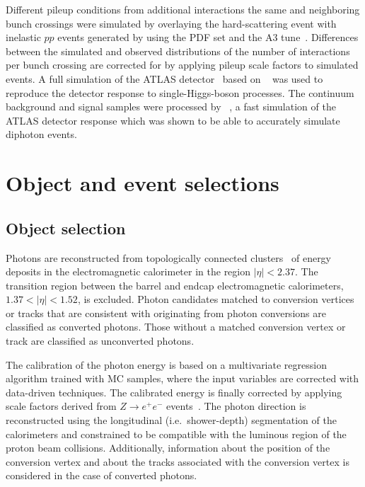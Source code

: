 \documentclass[PAPER, cernpreprint, texlive=2016, paper=a4, USenglish, texmf]{atlasdoc}
\begin{document}
 
Different pileup conditions from additional interactions the same and neighboring bunch crossings were simulated by overlaying the hard-scattering event with inelastic $pp$ events generated by \PYTHIA[8.186] using the \NNPDF[2.3lo] PDF set and the
A3 tune~\cite{ATL-PHYS-PUB-2016-017}. Differences between the simulated and observed distributions of the number of interactions per bunch crossing are corrected for by applying pileup scale factors to simulated events. A full simulation of the ATLAS detector~\cite{SOFT-2010-01} based on \GEANT~\cite{Agostinelli:2002hh} was used to reproduce the detector response to single-Higgs-boson processes. The continuum background and signal samples were processed by \atlfasttwo~\cite{ATLAS:1300517}, a fast simulation of the ATLAS detector response which was shown to be able to accurately simulate diphoton events.
 
 
\section{Object and event selections}
 
 
\subsection{Object selection}
\label{sec:object_sel}
Photons are reconstructed from topologically connected clusters~\cite{ATL-PHYS-PUB-2017-022} of energy deposits in the electromagnetic calorimeter in the region $|\eta| < 2.37$.
The transition region between the barrel and endcap electromagnetic calorimeters, $1.37 < |\eta| < 1.52$, is excluded.
Photon candidates matched to conversion vertices or tracks that are consistent with originating from photon conversions are classified as converted photons.
Those without a matched conversion vertex or track are classified as unconverted photons.
 
The calibration of the photon energy is based on a multivariate regression algorithm trained with MC samples, where the input variables are corrected with data-driven techniques. The calibrated energy is finally corrected by applying scale factors derived from $Z \rightarrow e^+ e^-$ events~\cite{EGAM-2018-01}.
The photon direction is reconstructed using the longitudinal (i.e.\ shower-depth) segmentation of the calorimeters and constrained to be compatible with the luminous region of the proton beam collisions.
Additionally, information about the position of the conversion vertex and about the tracks associated with the  conversion vertex is considered in the case of converted photons.
 
\end{document}
